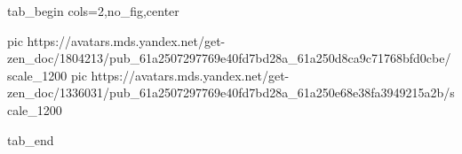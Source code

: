  
 
 
 
 


\ifcmt
  tab_begin cols=2,no_fig,center

     pic https://avatars.mds.yandex.net/get-zen_doc/1804213/pub_61a2507297769e40fd7bd28a_61a250d8ca9c71768bfd0cbe/scale_1200
		 pic https://avatars.mds.yandex.net/get-zen_doc/1336031/pub_61a2507297769e40fd7bd28a_61a250e68e38fa3949215a2b/scale_1200

  tab_end
\fi
